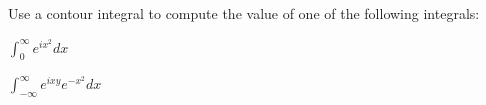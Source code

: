 Use a contour integral to compute the value of one of the following
integrals:
\begin{alist}
\item $\int_0^{\infty}e^{ix^2}dx$
\item $\int_{-\infty}^{\infty}e^{ixy}e^{-x^2}dx$
\end{alist}

